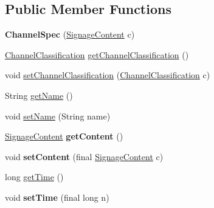 \subsection*{Public Member Functions}
\begin{DoxyCompactItemize}
\item 
\hypertarget{classgov_1_1fnal_1_1ppd_1_1dd_1_1xml_1_1ChannelSpec_a17141ffdb2fbd67bfd1a4b1edd83b7dc}{{\bfseries Channel\-Spec} (\hyperlink{interfacegov_1_1fnal_1_1ppd_1_1dd_1_1signage_1_1SignageContent}{Signage\-Content} c)}\label{classgov_1_1fnal_1_1ppd_1_1dd_1_1xml_1_1ChannelSpec_a17141ffdb2fbd67bfd1a4b1edd83b7dc}

\item 
\hyperlink{classgov_1_1fnal_1_1ppd_1_1dd_1_1changer_1_1ChannelClassification}{Channel\-Classification} \hyperlink{classgov_1_1fnal_1_1ppd_1_1dd_1_1xml_1_1ChannelSpec_a24166b1e786b9e7ca56349721e161661}{get\-Channel\-Classification} ()
\item 
void \hyperlink{classgov_1_1fnal_1_1ppd_1_1dd_1_1xml_1_1ChannelSpec_aef1831e2c9ce866b7385d3ce26d7c7a6}{set\-Channel\-Classification} (\hyperlink{classgov_1_1fnal_1_1ppd_1_1dd_1_1changer_1_1ChannelClassification}{Channel\-Classification} c)
\item 
String \hyperlink{classgov_1_1fnal_1_1ppd_1_1dd_1_1xml_1_1ChannelSpec_a6aac0c216c658ef18bc54d5d8b61d4d4}{get\-Name} ()
\item 
void \hyperlink{classgov_1_1fnal_1_1ppd_1_1dd_1_1xml_1_1ChannelSpec_a7b261516ee8d2de69bbebd5edb0d4f54}{set\-Name} (String name)
\item 
\hypertarget{classgov_1_1fnal_1_1ppd_1_1dd_1_1xml_1_1ChannelSpec_abe2d2d6c4dcb5adf92b7e3feaf4a3441}{\hyperlink{interfacegov_1_1fnal_1_1ppd_1_1dd_1_1signage_1_1SignageContent}{Signage\-Content} {\bfseries get\-Content} ()}\label{classgov_1_1fnal_1_1ppd_1_1dd_1_1xml_1_1ChannelSpec_abe2d2d6c4dcb5adf92b7e3feaf4a3441}

\item 
\hypertarget{classgov_1_1fnal_1_1ppd_1_1dd_1_1xml_1_1ChannelSpec_afa864ed5c883d94bcc86678c7cb8c3eb}{void {\bfseries set\-Content} (final \hyperlink{interfacegov_1_1fnal_1_1ppd_1_1dd_1_1signage_1_1SignageContent}{Signage\-Content} c)}\label{classgov_1_1fnal_1_1ppd_1_1dd_1_1xml_1_1ChannelSpec_afa864ed5c883d94bcc86678c7cb8c3eb}

\item 
long \hyperlink{classgov_1_1fnal_1_1ppd_1_1dd_1_1xml_1_1ChannelSpec_a98b9534e6dd2561a140735af84281d67}{get\-Time} ()
\item 
\hypertarget{classgov_1_1fnal_1_1ppd_1_1dd_1_1xml_1_1ChannelSpec_a5ea9412ca266ecdb2b4766abfeb0fd60}{void {\bfseries set\-Time} (final long n)}\label{classgov_1_1fnal_1_1ppd_1_1dd_1_1xml_1_1ChannelSpec_a5ea9412ca266ecdb2b4766abfeb0fd60}


\end{DoxyCompactItemize}
